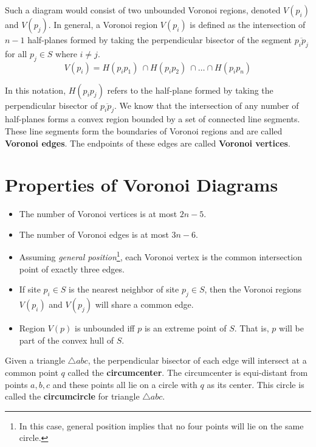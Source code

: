 \documentclass[10pt]{article}
\begin{document}
Such a diagram would consist of two unbounded Voronoi regions, denoted
$V(p_i)$ and $V(p_j)$.  In general, a Voronoi region $V(p_i)$ is
defined as the intersection of $n-1$ half-planes formed by taking the
perpendicular bisector of the segment $\overline{p_i p_j}$ for all
$p_j \in S$ where $i \neq j$.
\[ V(p_i) = H(p_i p_1) \ \cap H(p_i p_2) \ \cap \ldots \cap
H(p_i p_n) \]

\begin{center}
\end{center}

In this notation, $H(p_i p_j)$ refers to the half-plane formed by
taking the perpendicular bisector of $\overline{p_i p_j}$.  We know
that the intersection of any number of half-planes forms a convex
region bounded by a set of connected line segments. These line
segments form the boundaries of Voronoi regions and are called {\bf
Voronoi edges}.  The endpoints of these edges are called {\bf Voronoi
vertices}.

\section{Properties of Voronoi Diagrams}

\begin{itemize}
\item The number of Voronoi vertices is at most $2n - 5$.

\item The number of Voronoi edges is at most $3n - 6$.

\item Assuming {\em general position}\footnote{In this case, general
position implies that no four points will lie on the same circle.},
each Voronoi vertex is the common intersection point of exactly three
edges.

\item If site $p_i \in S$ is the nearest neighbor of site $p_j \in S$,
then the Voronoi regions $V(p_i)$ and $V(p_j)$ will share a common
edge.

\item Region $V(p)$ is unbounded iff $p$ is an extreme point of $S$.
That is, $p$ will be part of the convex hull of $S$.
\end{itemize}

Given a triangle $\triangle abc$, the perpendicular bisector of each
edge will intersect at a common point $q$ called the {\bf
circumcenter}.  The circumcenter is equi-distant from points $a,b,c$
and these points all lie on a circle with $q$ as its center.  This
circle is called the {\bf circumcircle} for triangle $\triangle abc$.
\end{document}
